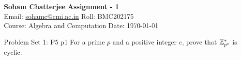 \documentclass[a4paper, 11pt]{article}
\begin{document}
	
	
	\textsf{\noindent \large\textbf{Soham Chatterjee} \hfill \textbf{Assignment - 1}\\
		Email: \href{sohamc@cmi.ac.in}{sohamc@cmi.ac.in} \hfill Roll: BMC202175\\
		\normalsize Course: Algebra and Computation \hfill Date: \today}
	
	
\begin{problem}{%
		Problem Set 1: P5
	}{p1%
}
For a prime $p$ and a positive integer $e$, prove that $\mathbb{Z}_{p^e}^*$ is cyclic.
\end{problem}
\end{document}
